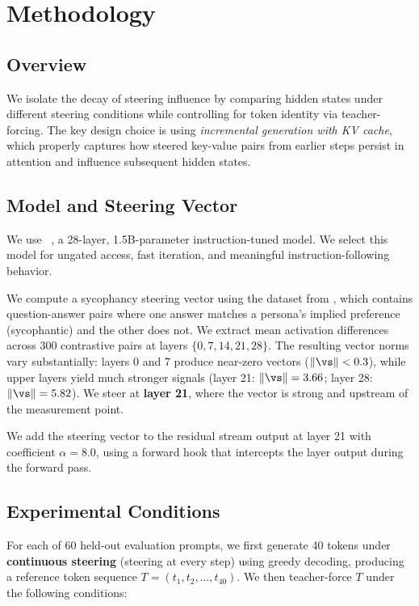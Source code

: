 \section{Methodology}
\label{sec:method}

\subsection{Overview}

We isolate the decay of steering influence by comparing hidden states under different steering conditions while controlling for token identity via teacher-forcing. The key design choice is using \emph{incremental generation with KV cache}, which properly captures how steered key-value pairs from earlier steps persist in attention and influence subsequent hidden states.

\subsection{Model and Steering Vector}

 We use \qwen~\citep{qwen2024}, a 28-layer, 1.5B-parameter instruction-tuned model. We select this model for ungated access, fast iteration, and meaningful instruction-following behavior.

 We compute a sycophancy steering vector using the \caa dataset from \citet{rimsky2024steering}, which contains question-answer pairs where one answer matches a persona's implied preference (sycophantic) and the other does not. We extract mean activation differences across 300 contrastive pairs at layers $\{0, 7, 14, 21, 28\}$. The resulting vector norms vary substantially: layers 0 and 7 produce near-zero vectors ($\|\steeringvec\| < 0.3$), while upper layers yield much stronger signals (layer 21: $\|\steeringvec\| = 3.66$; layer 28: $\|\steeringvec\| = 5.82$). We steer at \textbf{layer 21}, where the vector is strong and upstream of the measurement point.

 We add the steering vector to the residual stream output at layer 21 with coefficient $\alpha = 8.0$, using a forward hook that intercepts the layer output during the forward pass.

\subsection{Experimental Conditions}

For each of 60 held-out evaluation prompts, we first generate 40 tokens under \textbf{continuous steering} (steering at every step) using greedy decoding, producing a reference token sequence $T = (t_1, t_2, \ldots, t_{40})$. We then teacher-force $T$ under the following conditions:

